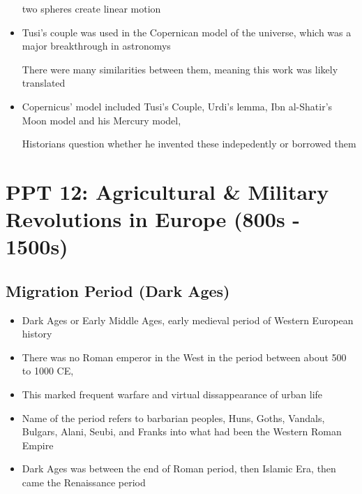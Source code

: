 \documentclass{article}
\begin{document}
\begin{itemize}
    two spheres create linear motion
  \item Tusi's couple was used in the Copernican model of the universe,
    which was a major breakthrough in astronomys

    There were many similarities between them, meaning this work was likely translated
  \item Copernicus' model included Tusi's Couple, Urdi's lemma,
    Ibn al-Shatir's Moon model and his Mercury model,

    Historians question whether he invented these indepedently or borrowed them
\end{itemize}

\newpage

\section{PPT 12: Agricultural \& Military Revolutions in Europe (800s - 1500s)}

\subsection{Migration Period (Dark Ages)}
\begin{itemize}
  \item Dark Ages or Early Middle Ages,
    early medieval period of Western European history
  \item There was no Roman emperor in the West
    in the period between about 500 to 1000 CE,
  \item This marked frequent warfare and virtual dissappearance of urban life
  \item Name of the period refers to barbarian peoples,
    Huns, Goths, Vandals, Bulgars, Alani, Seubi, and Franks into what had
    been the Western Roman Empire
  \item Dark Ages was between the end of Roman period, then Islamic Era, then came
    the Renaissance period
\end{itemize}
\end{document}

